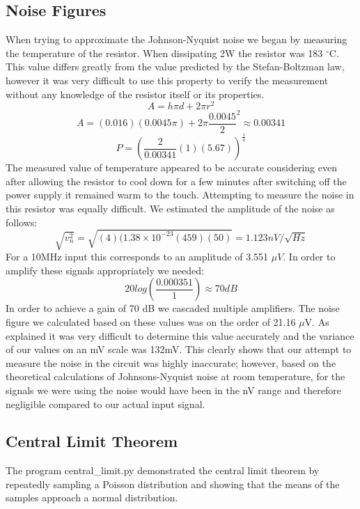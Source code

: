 \documentclass[11pt]{article}
\begin{document}
  \subsection{Noise Figures}
  When trying to approximate the Johnson-Nyquist noise we began by measuring the temperature of the resistor.  When dissipating 2W the resistor was 183 $^{\circ}$C.
  This value differs greatly from the value predicted by the Stefan-Boltzman law, however it was very difficult to use this property to verify the measurement without any knowledge of the resistor itself or its properties.
  $$A = h\pi d + 2\pi r^2$$
  $$A = (0.016)(0.0045\pi)+2\pi \frac{0.0045}{2}^2 \approx 0.00341$$
  $$P = \left( \frac{2}{0.00341}(1)(5.67) \right)^{\frac{1}{4}}$$
  The measured value of temperature appeared to be accurate considering even after allowing the resistor to cool down for a few minutes after switching off the power supply it remained warm to the touch.
  Attempting to measure the noise in this resistor was equally difficult.
  We estimated the amplitude of the noise as follows:
  $$\sqrt{v^2_n} = \sqrt{(4)(1.38\times 10^{-23}(459)(50)} = 1.123 nV/\sqrt{Hz}$$
  For a 10MHz input this corresponds to an amplitude of 3.551 $\mu V$.  In order to 
  amplify these signals appropriately we needed:
  $$20 log(\frac{0.000351}{1}) \approx 70 dB$$
  In order to achieve a gain of 70 dB we cascaded multiple amplifiers.
  The noise figure we calculated based on these values was on the order of 21.16 $\mu$V.  As explained it was very difficult to determine this value accurately and the variance of our values on an mV scale was 132mV. This clearly shows that our attempt to measure the noise in the circuit was highly inaccurate; however, based on the theoretical calculations of Johnsons-Nyquist noise at room temperature, for the signals we were using the noise would have been in the nV range and therefore negligible compared to our actual input signal.
  
  \subsection{Central Limit Theorem}
  The program central\_limit.py demonstrated the central limit theorem by repeatedly sampling a Poisson distribution and showing that the means of the samples approach a normal distribution. 
  
\end{document}
